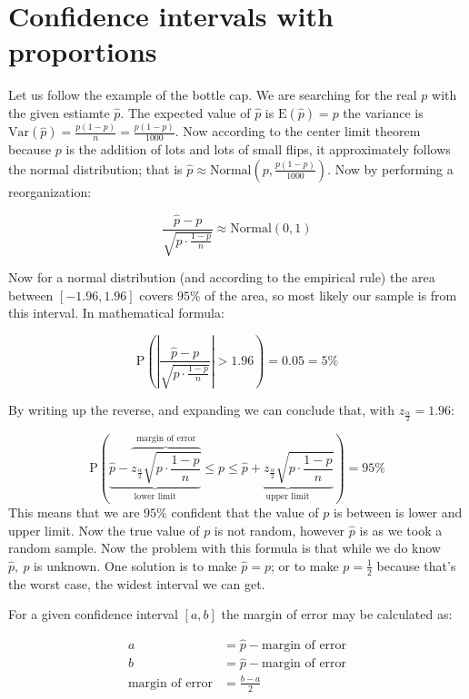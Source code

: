 \section{Confidence intervals with proportions}

Let us follow the example of the bottle cap. We are searching for the real $p$
with the given estiamte $\hat{p}$. The expected value of $\hat{p}$ is
$\mbox{E}(\hat{p})=p$ the variance is $\mbox{Var}(\hat{p}) =
\frac{p(1-p)}{n}=\frac{p(1-p)}{1000}$. Now according to the center limit theorem
because $p$ is the addition of lots and lots of small flips, it approximately
follows the normal distribution; that is $\hat{p} \approx
\mbox{Normal}\left(p, \frac{p(1-p)}{1000}\right)$. Now by performing a
reorganization:

\[ \frac{\hat{p}-p}{\sqrt{p\cdot\frac{1-p}{n}}} \approx \mbox{Normal}(0,1) \]

Now for a normal distribution (and according to the empirical rule) the area
between $[-1.96, 1.96]$ covers $95\%$ of the area, so most likely our sample is
from this interval. In mathematical formula:


\[ \mbox{P} \left( \left| \frac{\hat{p}-p}{\sqrt{p\cdot\frac{1-p}{n}}} \right| >
1.96\right) = 0.05 = 5\%
\]

By writing up the reverse, and expanding we can conclude that, with
$z_{\frac{\alpha}{2}} = 1.96$:

\[ \mbox{P} \left( \underbrace{\hat{p} - \overbrace{z_{\frac{\alpha}{2}}\sqrt{p
\cdot \frac{1-p}{n}}}^{\mbox{margin of error}}}_{\mbox{lower limit}} \leq p \leq
\underbrace{\hat{p} + z_{\frac{\alpha}{2}}\sqrt{p \cdot
\frac{1-p}{n}}}_{\mbox{upper limit}} \right) = 95\%
\]
This means that we are $95\%$ confident that the value of $p$ is between is
lower and upper limit. Now the true value of $p$ is not random, however
$\hat{p}$ is as we took a random sample. Now the problem with this formula is
that while we do know $\hat{p},~p$ is unknown. One solution is to make
$\hat{p}=p$; or to make $p=\frac{1}{2}$ because that's the worst case, the
widest interval we can get.

For a given confidence interval $[a,b]$ the margin of error may be calculated
as:

\begin{align*}
a &= \hat{p} - \mbox{margin of error} \\
  b &= \hat{p} - \mbox{margin of error} \\
  \mbox{margin of error} &= \frac{b-a}{2}
\end{align*}

